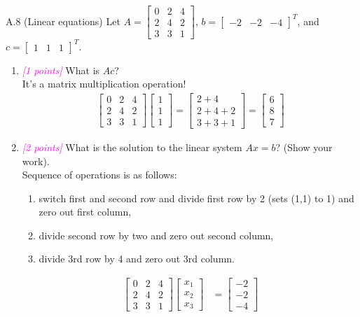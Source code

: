 \documentclass{article}
\newcommand{\1}{\mathbf{1}}
\newcommand{\points}[1]{\small\textcolor{magenta}{\emph{[#1 points]}} \normalsize}
\begin{document}
\newpage
A.8 (Linear equations) Let $A = \begin{bmatrix} 0 & 2 & 4 \\ 2 & 4 & 2 \\ 3 & 3 & 1 \end{bmatrix}$, $b = \begin{bmatrix} -2 & -2 & -4 \end{bmatrix}^T$, and $c=\begin{bmatrix} 1 & 1 & 1 \end{bmatrix}^T$.
\begin{enumerate}
	\item \points{1} What is $Ac$? \\ It's a matrix multiplication operation!
	\begin{align*}
	    \begin{bmatrix} 0 & 2 & 4 \\ 2 & 4 & 2 \\ 3 & 3 & 1 \end{bmatrix} \begin{bmatrix} 1 \\ 1 \\ 1 \end{bmatrix} = \begin{bmatrix} 2+4 \\ 2+4+2 \\ 3+3+1 \end{bmatrix} = \begin{bmatrix} 6 \\ 8 \\ 7 \end{bmatrix}
	\end{align*}
	\item \points{2} What is the solution to the linear system $Ax = b$? (Show your work). \\
	Sequence of operations is as follows: 
	\begin{enumerate}
	    \item switch first and second row and divide first row by 2 (sets (1,1) to 1) and zero out first column,
	    \item divide second row by two and zero out second column, 
	    \item divide 3rd row by 4 and zero out 3rd column.
	\end{enumerate}
	\begin{align*}
	    \begin{bmatrix} 0 & 2 & 4 \\ 2 & 4 & 2 \\ 3 & 3 & 1 \end{bmatrix} \begin{bmatrix} x_1 \\ x_2 \\ x_3 \end{bmatrix} &= \begin{bmatrix} -2 \\ -2 \\ -4 \end{bmatrix} \\

\end{align*}
\end{enumerate}
\end{document}
